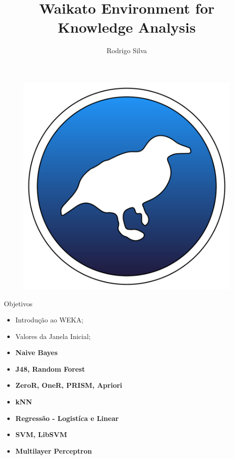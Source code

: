 \documentclass[12pt]{beamer}
\author{Rodrigo Silva}
\title{Waikato Environment for Knowledge Analysis}
\date{}
\begin{document}
\begin{frame}
\titlepage
\begin{figure}
\centering
\includegraphics[scale=0.13]{photo}
\end{figure}
\end{frame}

\begin{frame}{Objetivos}
\begin{itemize}
\item Introdução ao WEKA;\pause
\item Valores da Janela Inicial;\pause
\item {\bf Naive Bayes}\pause
\item {\bf J48, Random Forest}\pause
\item {\bf ZeroR, OneR, PRISM, Apriori}\pause
\item {\bf kNN}\pause
\item {\bf Regressão - Logistíca e Linear}\pause
\item {\bf SVM, LibSVM}\pause
\item {\bf Multilayer Perceptron}
\end{itemize}
\end{frame}
\end{document}
